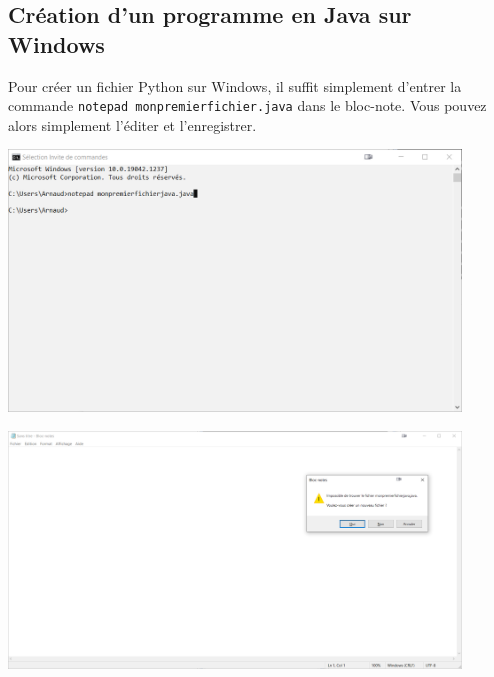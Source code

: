 \subsection{Création d'un programme en Java sur Windows}

Pour créer un fichier Python sur Windows, il suffit simplement d'entrer la commande \lstinline{notepad monpremierfichier.java} dans le bloc-note. Vous pouvez alors simplement l'éditer et l'enregistrer.

\begin{center}
	\includegraphics[width=12cm]{2j}
\end{center}
\begin{center}
	\includegraphics[width=12cm]{3j}
\end{center}

